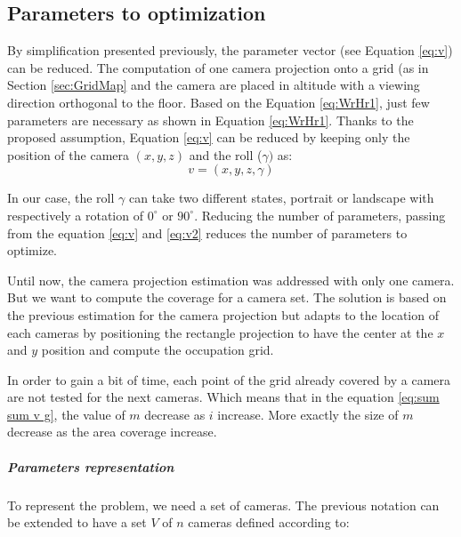 \subsection{Parameters to optimization }\label{sec:parameterToOptimize}
By simplification presented previously, the parameter vector (see Equation \ref{eq:v}) can be reduced.
The computation of one camera projection onto a grid (as in Section \ref{sec:GridMap} and the camera are placed in altitude with a viewing direction orthogonal to the floor. Based on the Equation \ref{eq:WrHr1},
just few parameters are necessary as shown in Equation \ref{eq:WrHr1}. Thanks to the proposed assumption,  Equation \ref{eq:v} can be reduced by keeping only the position of the camera $(x,y,z)$ and the roll ($\gamma)$ as:
	\begin{equation}\label{eq:v2}
		v=(x,y,z,\gamma ) 
	\end{equation}

In our case, the roll $\gamma$ can take two different states, portrait or landscape with respectively a rotation of $0^\circ$ or $90^\circ$.
Reducing the number of  parameters, passing from the equation \ref{eq:v} and \ref{eq:v2} reduces the number of parameters to optimize. 


Until now, the camera projection estimation was addressed with only one camera. But we want to compute the coverage for a camera set. 
The solution is based on the previous estimation for the camera projection but adapts to the location of each cameras by positioning the rectangle projection to have the center at the $x$ and $y$ position and compute the occupation grid.

In order to gain a bit of time, each point of the grid already covered by a camera are not tested for the next cameras. %
Which means that in the equation \ref{eq:sum sum v g}, the value of $m$ decrease as $i$ increase. More exactly the size of $m$ decrease as the area coverage increase.  


\subparagraph{Parameters representation \\}

To represent the problem, we need a set of cameras. The previous notation can be extended to have a set $V$ of $n$ cameras defined according to:

